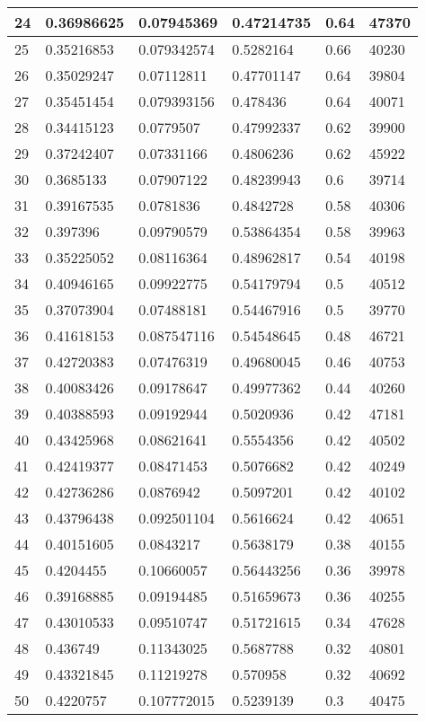\begin{longtable}{|l|l|l|l|l|l|}
24 & 0.36986625 & 0.07945369 & 0.47214735 & 0.64 & 47370 \\ \hline 
25 & 0.35216853 & 0.079342574 & 0.5282164 & 0.66 & 40230 \\ \hline 
26 & 0.35029247 & 0.07112811 & 0.47701147 & 0.64 & 39804 \\ \hline 
27 & 0.35451454 & 0.079393156 & 0.478436 & 0.64 & 40071 \\ \hline 
28 & 0.34415123 & 0.0779507 & 0.47992337 & 0.62 & 39900 \\ \hline 
29 & 0.37242407 & 0.07331166 & 0.4806236 & 0.62 & 45922 \\ \hline 
30 & 0.3685133 & 0.07907122 & 0.48239943 & 0.6 & 39714 \\ \hline 
31 & 0.39167535 & 0.0781836 & 0.4842728 & 0.58 & 40306 \\ \hline 
32 & 0.397396 & 0.09790579 & 0.53864354 & 0.58 & 39963 \\ \hline 
33 & 0.35225052 & 0.08116364 & 0.48962817 & 0.54 & 40198 \\ \hline 
34 & 0.40946165 & 0.09922775 & 0.54179794 & 0.5 & 40512 \\ \hline 
35 & 0.37073904 & 0.07488181 & 0.54467916 & 0.5 & 39770 \\ \hline 
36 & 0.41618153 & 0.087547116 & 0.54548645 & 0.48 & 46721 \\ \hline 
37 & 0.42720383 & 0.07476319 & 0.49680045 & 0.46 & 40753 \\ \hline 
38 & 0.40083426 & 0.09178647 & 0.49977362 & 0.44 & 40260 \\ \hline 
39 & 0.40388593 & 0.09192944 & 0.5020936 & 0.42 & 47181 \\ \hline 
40 & 0.43425968 & 0.08621641 & 0.5554356 & 0.42 & 40502 \\ \hline 
41 & 0.42419377 & 0.08471453 & 0.5076682 & 0.42 & 40249 \\ \hline 
42 & 0.42736286 & 0.0876942 & 0.5097201 & 0.42 & 40102 \\ \hline 
43 & 0.43796438 & 0.092501104 & 0.5616624 & 0.42 & 40651 \\ \hline 
44 & 0.40151605 & 0.0843217 & 0.5638179 & 0.38 & 40155 \\ \hline 
45 & 0.4204455 & 0.10660057 & 0.56443256 & 0.36 & 39978 \\ \hline 
46 & 0.39168885 & 0.09194485 & 0.51659673 & 0.36 & 40255 \\ \hline 
47 & 0.43010533 & 0.09510747 & 0.51721615 & 0.34 & 47628 \\ \hline 
48 & 0.436749 & 0.11343025 & 0.5687788 & 0.32 & 40801 \\ \hline 
49 & 0.43321845 & 0.11219278 & 0.570958 & 0.32 & 40692 \\ \hline 
50 & 0.4220757 & 0.107772015 & 0.5239139 & 0.3 & 40475 \\ \hline 
\end{longtable}